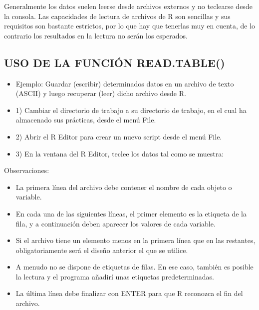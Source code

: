 \documentclass[12pt,letterpaper]{article}\usepackage[]{graphicx}\usepackage[]{color}
\begin{document}
Generalmente los datos suelen leerse desde archivos externos y no teclearse desde la consola. Las
capacidades de lectura de archivos de R son sencillas y sus requisitos son bastante estrictos, por lo
que hay que tenerlas muy en cuenta, de lo contrario los resultados en la lectura no ser\'an los
esperados.
\subsection{USO DE LA FUNCI\'ON READ.TABLE()}
\begin{itemize}
\item Ejemplo: Guardar (escribir) determinados datos en un archivo de texto (ASCII) y luego recuperar
(leer) dicho archivo desde R.
\end{itemize}
\begin{itemize}
\item {1) } Cambiar el directorio de trabajo a su directorio de trabajo, en el cual ha almacenado sus
pr\'acticas, desde el men\'u File.\\
\item {2) } Abrir el R Editor para crear un nuevo script desde el men\'u File.\\
\item {3) } En la ventana del R Editor, teclee los datos tal como se muestra:\\
\end{itemize}
Observaciones:
\begin{itemize}
\item La primera l\'inea del archivo debe contener el nombre de cada objeto o variable.
\item En cada una de las siguientes l\'ineas, el primer elemento es la etiqueta de la fila, y a
continuaci\'on deben aparecer los valores de cada variable.
\item Si el archivo tiene un elemento menos en la primera l\'inea que en las restantes,
obligatoriamente ser\'a el dise\~no anterior el que se utilice.
\item A menudo no se dispone de etiquetas de filas. En ese caso, tambi\'en es posible la lectura y el programa a\~nadir\'i unas etiquetas predeterminadas.
\item La \'ultima l\'inea debe finalizar con ENTER para que R reconozca el fin del archivo.
\end{itemize}
\end{document}
